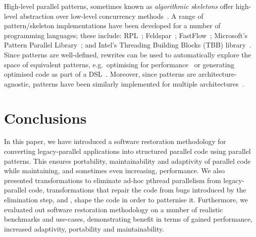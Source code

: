 High-level parallel patterns, sometimes known as \emph{algorithmic skeletons} offer high-level abstraction over low-level concurrency methods~\cite{Asanovic:2009:VPC,DBLP:journals/spe/Gonzalez-VelezL10}.
A range of pattern/skeleton implementations have been developed for a number of programming languages; these include: RPL~\cite{DBLP:conf/pdp/JanjicBMHDAG16}; Feldspar~\cite{DBLP:conf/ifl/AxelssonCSSEP10}; FastFlow~\cite{doi:10.1002/9781119332015.ch13}; Microsoft's Pattern Parallel Library~\cite{ACM:book/msoft/CampbellM11}; and Intel's Threading Building Blocks (TBB) library~\cite{DBLP:reference/parallel/X11pz}.
Since patterns are well-defined, rewrites can be used to automatically explore the space of equivalent patterns, e.g.\ optimising for performance~\cite{DBLP:conf/europar/MatsuzakiKIHA04,DBLP:conf/ipps/GorlatchWL99} or generating optimised code as part of a DSL~\cite{DBLP:conf/dagstuhl/Gorlatch03}. Moreover, since patterns are architecture-agnostic, patterns have been similarly implemented for multiple architectures~\cite{DBLP:conf/cgo/HagedornSSGD18,DBLP:conf/parco/ReyesL15}.

\section{Conclusions} \label{sec:Conclusions} 
In this paper, we have introduced a software restoration methodology for converting legacy-parallel applications into structured parallel code using parallel patterns. This ensures portability, maintainability and adaptivity of parallel code while maintaining, and sometimes even increasing, performance. We also presented transformations to eliminate ad-hoc pthread parallelism from legacy-parallel code, transformations that repair the code from bugs introduced by the elimination step, and , shape the code in order to patternise it. Furthermore, we evaluated out software restoration methodology on a number of realistic benchmarks and use-cases, demonstrating benefit in terms of gained performance, increased adaptivity, portability and maintainability.






